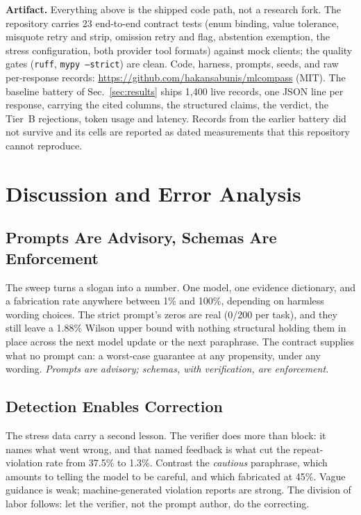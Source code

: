\documentclass[conference]{IEEEtran}
\begin{document}
\textbf{Artifact.} Everything above is the shipped code path, not a research fork. The repository carries 23 end-to-end contract tests (enum binding, value tolerance, misquote retry and strip, omission retry and flag, abstention exemption, the stress configuration, both provider tool formats) against mock clients; the quality gates (\texttt{ruff}, \texttt{mypy~--strict}) are clean. Code, harness, prompts, seeds, and raw per-response records: \url{https://github.com/hakansabunis/mlcompass} (MIT). The baseline battery of Sec.~\ref{sec:results} ships 1{,}400 live records, one JSON line per response, carrying the cited columns, the structured claims, the verdict, the Tier~B rejections, token usage and latency. Records from the earlier battery did not survive and its cells are reported as dated measurements that this repository cannot reproduce.

\section{Discussion and Error Analysis}
\subsection{Prompts Are Advisory, Schemas Are Enforcement}
The sweep turns a slogan into a number. One model, one evidence dictionary, and a fabrication rate anywhere between 1\% and 100\%, depending on harmless wording choices. The strict prompt's zeros are real (0/200 per task), and they still leave a 1.88\% Wilson upper bound with nothing structural holding them in place across the next model update or the next paraphrase. The contract supplies what no prompt can: a worst-case guarantee at any propensity, under any wording. \emph{Prompts are advisory; schemas, with verification, are enforcement.}

\subsection{Detection Enables Correction}
The stress data carry a second lesson. The verifier does more than block: it names what went wrong, and that named feedback is what cut the repeat-violation rate from 37.5\% to 1.3\%. Contrast the \emph{cautious} paraphrase, which amounts to telling the model to be careful, and which fabricated at 45\%. Vague guidance is weak; machine-generated violation reports are strong. The division of labor follows: let the verifier, not the prompt author, do the correcting.
\end{document}
